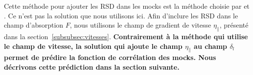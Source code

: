 \documentclass[11pt, twoside, a4paper, openright]{report}
\begin{document}
Cette méthode pour ajouter les RSD dans les mocks \lya{} est la méthode choisie par \textcite{le_goff_simulations_2011} et \textcite{Farr2019}.
Ce n'est pas la solution que nous utilisons ici. Afin d'inclure les RSD dans le champ d'absorption $F$, nous utilisons le champ de gradient de vitesse $\eta_{\parallel}$, présenté dans la section~\ref{subsubsec:vitesses}.
\textbf{Contrairement à la méthode qui utilise le champ de vitesse, la solution qui ajoute le champ $\eta_{\parallel}$ au champ $\delta_l$ permet de prédire la fonction de corrélation des mocks. Nous décrivons cette prédiction dans la section suivante.}
\end{document}

